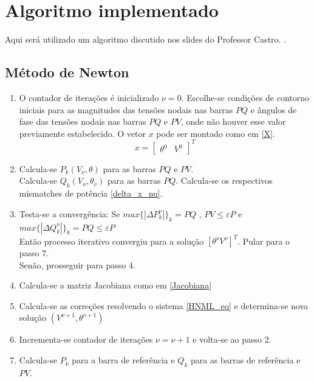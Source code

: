 \section{Algoritmo implementado}

Aqui será utilizado um algoritmo discutido nos slides do Professor Castro. \cite{castro}.

\subsection{Método de Newton}
\label{SubsectionMetodoNewton}
\begin{enumerate}
    \item   O contador de iterações é inicializado $\nu = 0$.   Escolhe-se condições de contorno iniciais para as magnitudes das tensões nodais nas barras $PQ$ e ângulos de fase das tensões nodais nas barras $PQ$ e $PV$, onde não houver esse valor previamente estabelecido.
            O vetor $x$ pode ser montado como em \ref{X}.
            \begin{equation}
            x  = \left[ \begin{matrix} \theta^0 & V^0  \end{matrix} \right]^T 
            \label{X}
            \end{equation}
    \item   Calcula-se $P_k(V_\nu, \theta)$ para as barras $PQ$ e $PV$.\\
            Calcula-se $Q_k(V_\nu, \theta_\nu)$ para as barras $PQ$.
            Calcula-se os respectivos mismatches de potência \ref{delta_x_nu}.
    \item   Testa-se a convergência: Se $max \{|\Delta P_k^\nu|\}_k=PQ$ , $PV\leq \varepsilon P$ e $max \{|\Delta Q_k^\nu|\}_k=PQ \leq \varepsilon P$\\
            Então processo iterativo convergiu para a solução $[\theta ^\nu V^\nu]^T$. Pular para o passo $7$.\\
            Senão, prosseguir para passo $4$.
    \item   \label{ItemJacobiana} Calcula-se a matriz Jacobiana como em \ref{Jacobiana}
    \item   Calcula-se as correções resolvendo o sistema \ref{HNML_eq} e determina-se nova solução $(V^{\nu + 1},\theta^{\nu + 1})$
    \item   Incrementa-se contador de iterações $\nu = \nu + 1$ e volta-se ao passo 2.
    \item   Calcula-se $P_k$ para a barra de referência e $Q_k$ para as barras de referência e $PV$.
\end{enumerate}

